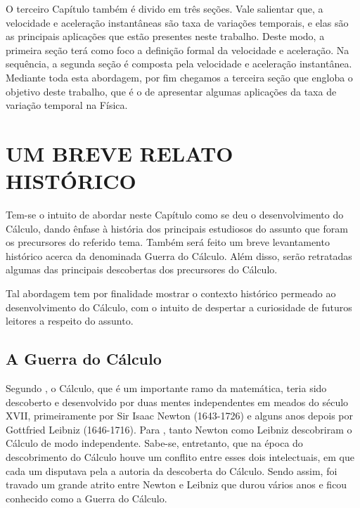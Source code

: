 \documentclass[
	12pt,				%
	openright,			%
    twoside,			%
	a4paper,			%
	chapter=TITLE,		%
	english,			%
	french,				%
	spanish,			%
	brazil				%
	]{abntex2}
\numberwithin{lema}{chapter}
\numberwithin{teorema}{chapter}
\numberwithin{definicao}{chapter}
\numberwithin{exemplo}{chapter}
\numberwithin{figure}{chapter}
\begin{document}
O terceiro Capítulo também é divido em três seções. Vale salientar que, a velocidade e aceleração instantâneas são taxa de variações temporais, e elas são as principais aplicações que estão presentes neste trabalho. Deste modo, a primeira seção terá como foco a definição formal da velocidade e aceleração. Na sequência, a segunda seção é composta pela velocidade e aceleração instantânea. Mediante toda esta abordagem, por fim chegamos a terceira seção que engloba o objetivo deste trabalho, que é o de apresentar algumas aplicações da taxa de variação temporal na Física.

\chapter{UM BREVE RELATO HISTÓRICO}
\label{capitulo_1} %
\thispagestyle{empty}

Tem-se o intuito de abordar neste Capítulo como se deu o desenvolvimento do Cálculo, dando ênfase à história dos principais estudiosos do assunto que foram os precursores do referido tema. Também será feito um breve levantamento histórico acerca da denominada Guerra do Cálculo. Além disso, serão retratadas algumas das principais descobertas dos precursores do Cálculo.

Tal abordagem tem por finalidade mostrar o contexto histórico permeado ao desenvolvimento do Cálculo, com o intuito de despertar a curiosidade de futuros leitores a respeito do assunto.

\section{A Guerra do Cálculo}
Segundo , o Cálculo, que é um importante ramo da matemática, teria sido descoberto e desenvolvido por duas mentes independentes em meados do século XVII, primeiramente por Sir Isaac Newton (1643-1726) e alguns anos depois por Gottfried Leibniz (1646-1716). Para , tanto Newton como Leibniz descobriram o Cálculo de modo independente. Sabe-se, entretanto, que na época do descobrimento do Cálculo houve um conflito entre esses dois intelectuais, em que cada um disputava pela a autoria da descoberta do Cálculo. Sendo assim, foi travado um grande atrito entre Newton e Leibniz que durou vários anos e ficou conhecido como a Guerra do Cálculo.
\end{document}
